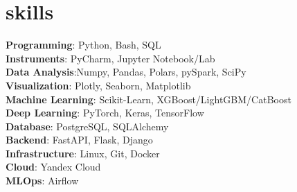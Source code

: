 \section{skills}
 \begin{itemize}[leftmargin=0.15in, label={}]
   {\item{
     \textbf{Programming}{: Python, Bash, SQL} \\
     \textbf{Instruments}{: PyCharm, Jupyter Notebook/Lab} \\
     \textbf{Data Analysis}{:Numpy, Pandas, Polars, pySpark, SciPy} \\
     \textbf{Visualization}{: Plotly, Seaborn, Matplotlib} \\
     \textbf{Machine Learning}{: Scikit-Learn, XGBoost/LightGBM/CatBoost} \\
     \textbf{Deep Learning}{: PyTorch, Keras, TensorFlow} \\
     \textbf{Database}{: PostgreSQL, SQLAlchemy} \\
     \textbf{Backend}{: FastAPI, Flask, Django} \\
     \textbf{Infrastructure}{: Linux, Git, Docker} \\
     \textbf{Cloud}{: Yandex Cloud} \\
     \textbf{MLOps}{: Airflow} \\
    }}
 \end{itemize}